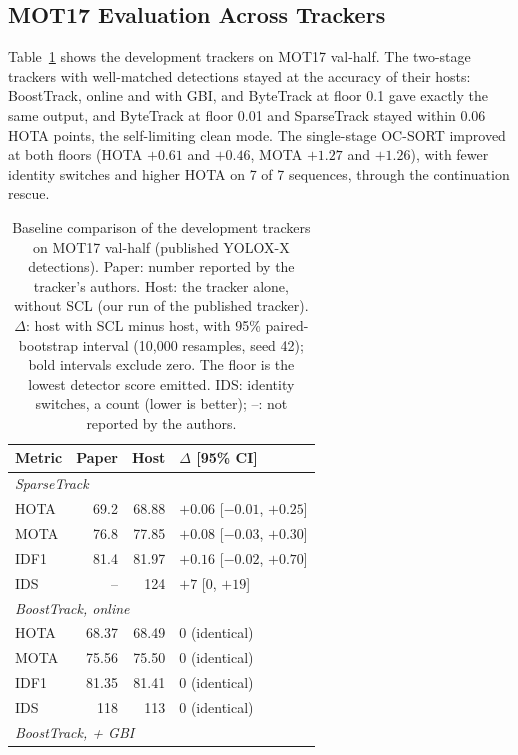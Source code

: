 \subsection{MOT17 Evaluation Across Trackers}\label{sec:res-scl-mot17}
Table~\ref{tab:res-scl-mot17} shows the development trackers on MOT17 val-half. The two-stage trackers with well-matched detections stayed at the accuracy of their hosts: BoostTrack, online and with GBI, and ByteTrack at floor 0.1 gave exactly the same output, and ByteTrack at floor 0.01 and SparseTrack stayed within 0.06 HOTA points, the self-limiting clean mode. The single-stage OC-SORT improved at both floors (HOTA $+0.61$ and $+0.46$, MOTA $+1.27$ and $+1.26$), with fewer identity switches and higher HOTA on 7 of 7 sequences, through the continuation rescue.

\begin{table}[tbp]
\centering
\caption{Baseline comparison of the development trackers on MOT17 val-half (published YOLOX-X detections). Paper: number reported by the tracker's authors. Host: the tracker alone, without SCL (our run of the published tracker). $\Delta$: host with SCL minus host, with 95\% paired-bootstrap interval (10,000 resamples, seed 42); bold intervals exclude zero. The floor is the lowest detector score emitted. IDS: identity switches, a count (lower is better); --: not reported by the authors.}
\label{tab:res-scl-mot17}
\begin{tabular}{lrrl}
\toprule
Metric & Paper & Host & $\Delta$ [95\% CI]\\
\midrule
\multicolumn{4}{l}{\textit{SparseTrack} \cite{liu2025sparsetrack}}\\
\quad HOTA & 69.2 & 68.88 & $+0.06$ [$-0.01$, $+0.25$]\\
\quad MOTA & 76.8 & 77.85 & $+0.08$ [$-0.03$, $+0.30$]\\
\quad IDF1 & 81.4 & 81.97 & $+0.16$ [$-0.02$, $+0.70$]\\
\quad IDS & -- & 124 & $+7$ [$0$, $+19$]\\
\multicolumn{4}{l}{\textit{BoostTrack, online} \cite{stanojevic2024boosttrack}}\\
\quad HOTA & 68.37 & 68.49 & 0 (identical)\\
\quad MOTA & 75.56 & 75.50 & 0 (identical)\\
\quad IDF1 & 81.35 & 81.41 & 0 (identical)\\
\quad IDS & 118 & 113 & 0 (identical)\\
\multicolumn{4}{l}{\textit{BoostTrack, + GBI} \cite{stanojevic2024boosttrack}}\\

\end{tabular}
\end{table}
